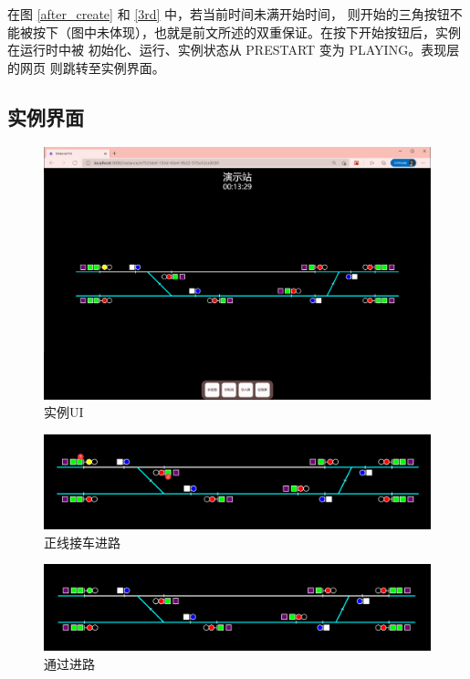 在图 \ref{after_create} 和 \ref{3rd}  中，若当前时间未满开始时间，
则开始的三角按钮不能被按下（图中未体现），也就是前文所述的双重保证。在按下开始按钮后，实例在运行时中被
初始化、运行、实例状态从 PRESTART 变为 PLAYING。表现层的网页
则跳转至实例界面。

\subsection{实例界面}

\begin{figure}[htbp!]
  \centering
  \includegraphics[width=\textwidth]{figures/png/insui.png}
  \caption{\label{insui}实例UI}
\end{figure}

\begin{figure}[htbp!]
  \centering
  \includegraphics[width=\textwidth]{figures/png/mainlnrecv.png}
  \caption{\label{mainlnrecv}正线接车进路}
\end{figure}

\begin{figure}[htbp!]
  \centering
  \includegraphics[width=\textwidth]{figures/png/pass.png}
  \caption{\label{pass}通过进路}
\end{figure}

